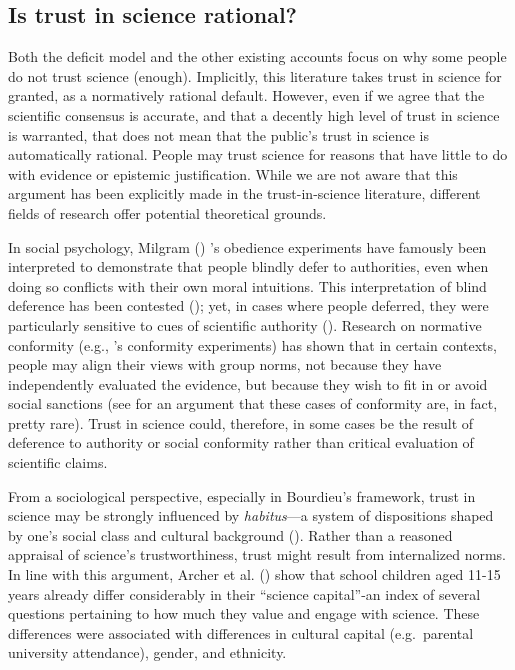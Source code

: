 \documentclass[
  jou,
  floatsintext,
  longtable,
  nolmodern,
  notxfonts,
  notimes,
  colorlinks=true,linkcolor=blue,citecolor=blue,urlcolor=blue]{apa7}
\begin{document}
\subsection{Is trust in science
rational?}\label{is-trust-in-science-rational}

Both the deficit model and the other existing accounts focus on why some
people do not trust science (enough). Implicitly, this literature takes
trust in science for granted, as a normatively rational default.
However, even if we agree that the scientific consensus is accurate, and
that a decently high level of trust in science is warranted, that does
not mean that the public's trust in science is automatically rational.
People may trust science for reasons that have little to do with
evidence or epistemic justification. While we are not aware that this
argument has been explicitly made in the trust-in-science literature,
different fields of research offer potential theoretical grounds.

In social psychology, Milgram
() 's
obedience experiments have famously been interpreted to demonstrate that
people blindly defer to authorities, even when doing so conflicts with
their own moral intuitions. This interpretation of blind deference has
been contested (); yet, in cases where people deferred, they were particularly
sensitive to cues of scientific authority
(). Research on normative conformity (e.g.,
 's
conformity experiments) has shown that in certain contexts, people may
align their views with group norms, not because they have independently
evaluated the evidence, but because they wish to fit in or avoid social
sanctions (see 
for an argument that these cases of conformity are, in fact, pretty
rare). Trust in science could, therefore, in some cases be the result of
deference to authority or social conformity rather than critical
evaluation of scientific claims.

From a sociological perspective, especially in Bourdieu's framework,
trust in science may be strongly influenced by \emph{habitus}---a system
of dispositions shaped by one's social class and cultural background
(). Rather than a reasoned appraisal of science's trustworthiness,
trust might result from internalized norms. In line with this argument,
Archer et al. ()
show that school children aged 11-15 years already differ considerably
in their ``science capital''-an index of several questions pertaining to
how much they value and engage with science. These differences were
associated with differences in cultural capital (e.g.~parental
university attendance), gender, and ethnicity.
\end{document}

